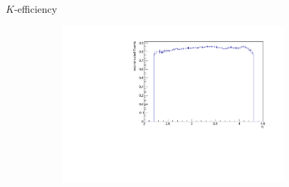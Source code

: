 \documentclass[11pt]{beamer}
\begin{document}
\begin{frame}{$K$-efficiency}
\begin{figure}
\begin{subfigure}{0.45\textwidth}
\end{subfigure}
\begin{subfigure}{0.45\textwidth}
\includegraphics[width=0.9\textwidth]{up_pdf/neg/h_eta_reco_K_neg.pdf}
\end{subfigure}
\end{figure}
\end{frame}
\end{document}

